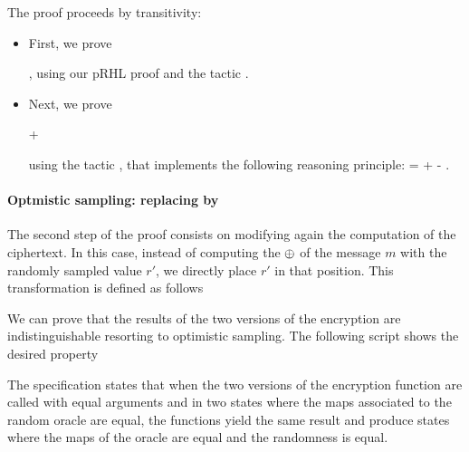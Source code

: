 
The proof proceeds by transitivity:
\begin{itemize}
\item First, we prove 

,
using our pRHL proof and the tactic .

\item Next, we prove


 +


using the tactic , that implements the following reasoning
principle:
 =   +  - .
 
\end{itemize}

\paragraph{Optmistic sampling: replacing  by }
The second step of the proof consists on modifying again the
computation of the ciphertext. In this case, instead of computing the
$\oplus$ of the message $m$ with the randomly sampled value $r'$, we
directly place $r'$ in that position. This transformation is defined
as follows

We can prove that the results of the two versions of the encryption
are indistinguishable resorting to optimistic sampling. The following
\EasyCrypt script shows the desired property


The specification states that when the two versions of the encryption
function are called with equal arguments and in two states where the
maps associated to the random oracle are equal, the functions yield
the same result and produce states where the maps of the oracle are
equal and the randomness is equal.  

